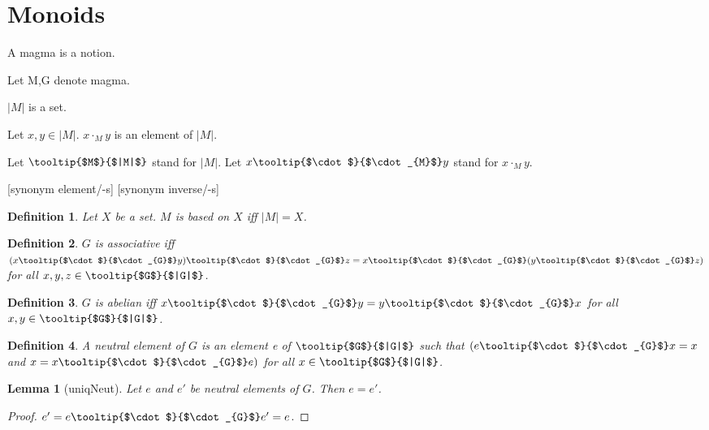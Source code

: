 \documentclass{article}
\newcommand{\gdotG}[1]{\cdot_{#1}}
\newcommand{\gdot}[1]{\mbox{\tooltip{$\cdot$}{$\cdot_{#1}$}}}
\newcommand{\sGC}[1]{\vert #1 \vert}
\newcommand{\sG}[1]{\mbox{\tooltip{$#1$}{$|#1|$}}}
\newtheorem*{definition}{Definition}
\newtheorem{lemma}{Lemma}
\begin{document}
\section{Monoids}
\begin{forthel}
	
	
	\begin{signature}
		A magma is a notion.
	\end{signature}
	Let M,G denote magma.
	
	\begin{signature}
		$\sGC{M}$ is a set.
	\end{signature}
	
	
	\begin{signature}
		Let $x,y \in \sGC{M}$. $x \gdotG{M} y$ is an element of $\sGC{M}$.
	\end{signature}
	Let $\sG{M}$ stand for $\sGC{M}$.
	Let $x \gdot{M} y$ stand for $x \gdotG{M} y$.
	
	[synonym element/-s] [synonym inverse/-s]
	\begin{definition}
		Let $X$ be a set. $M$ is based on $X$ iff $\sGC{M} = X$.
	\end{definition}
	\begin{definition}
		$G$ is associative iff $(x \gdot{G} y) \gdot{G} z = x \gdot{G} (y \gdot{G} z)$ for all $x,y,z \in \sG{G}$.
	\end{definition}
	
	\begin{definition}
		$G$ is abelian iff $x\gdot{G}y = y\gdot{G}x$ for all $x,y \in \sG{G}$.
	\end{definition}
	
	\begin{definition}
		A neutral element of $G$ is an element e of $\sG{G}$ such that $(e\gdot{G}x = x$ and $x = x \gdot{G} e)$ for all $x \in \sG{G}$.
	\end{definition}
	
	
	\begin{lemma}[uniqNeut]
		Let $e$ and $e'$ be neutral elements of $G$.
		Then $e = e'$.
	\end{lemma}
	\begin{proof}
		$e' = e \gdot{G} e' = e$.
	\end{proof}
	

\end{forthel}
\end{document}
